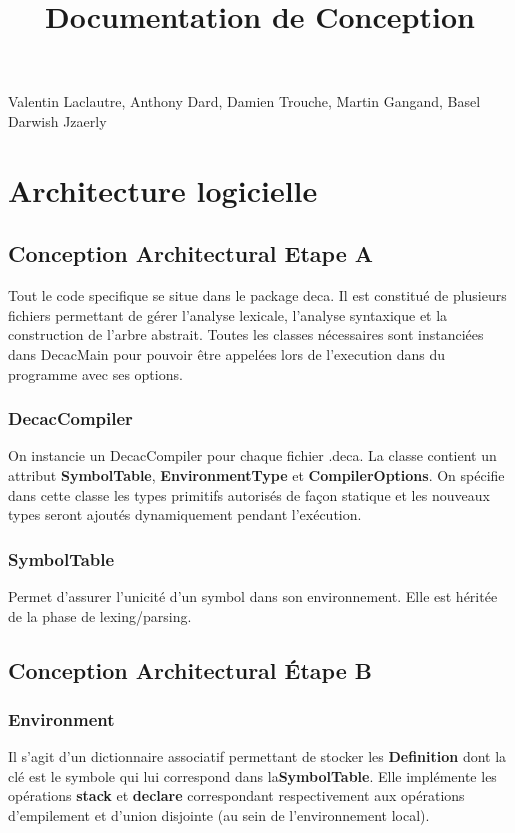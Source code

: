 \documentclass[12pt, a4paper, one side]{article}
\title{Documentation de Conception}
\author{}
\date{}
\begin{document}
    \maketitle

    \begin{center}
        Valentin Laclautre, Anthony Dard, Damien Trouche, Martin Gangand, Basel Darwish Jzaerly
    \end{center}

    \tableofcontents

    \newpage

    \section{Architecture logicielle}
    \subsection{Conception Architectural Etape A}
    Tout le code specifique se situe dans le package deca. Il est constitué de plusieurs fichiers
    permettant de gérer l'analyse lexicale, l'analyse syntaxique et la construction de l'arbre abstrait. Toutes les classes nécessaires sont instanciées dans DecacMain
    pour pouvoir être appelées lors de l'execution dans du programme avec ses options.
    \subsubsection{DecacCompiler}
    On instancie un DecacCompiler pour chaque fichier .deca. La classe contient un attribut \textbf{SymbolTable}, \textbf{EnvironmentType} et \textbf{CompilerOptions}. On spécifie dans cette classe les types primitifs autorisés de façon statique et les nouveaux types seront ajoutés dynamiquement pendant l'exécution.

    \subsubsection{SymbolTable}
    Permet d'assurer l'unicité d'un symbol dans son environnement.
    Elle est héritée de la phase de lexing/parsing.

    \subsection{Conception Architectural Étape B}

    \subsubsection{Environment}
    Il s'agit d'un dictionnaire associatif permettant de stocker les \textbf{Definition} dont la clé est le symbole qui lui correspond dans la\textbf{SymbolTable}. Elle implémente les opérations \textbf{stack} et \textbf{declare} correspondant respectivement aux opérations d'empilement et d'union disjointe (au sein de l'environnement local).
\end{document}
